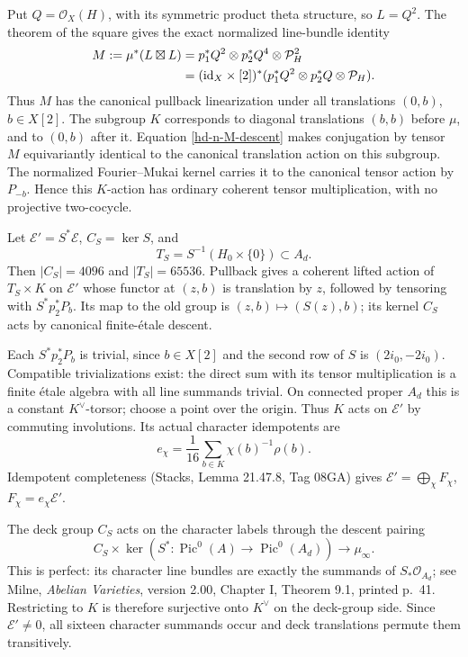 Put $Q=\mathcal O_X(H)$, with its symmetric product theta structure,
so $L=Q^2$. The theorem of the square gives the exact normalized
line-bundle identity
\begin{align}
 M:=\mu^*(L\boxtimes L)
 &=p_1^*Q^2\otimes p_2^*Q^4\otimes\mathcal P_H^2\notag\\
 &=(\mathrm{id}_X\times[2])^*
   (p_1^*Q^2\otimes p_2^*Q\otimes\mathcal P_H).
 \label{hd-n-M-descent}
\end{align}
Thus $M$ has the canonical pullback linearization under all translations
$(0,b)$, $b\in X[2]$. The subgroup $K$ corresponds to diagonal
translations $(b,b)$ before $\mu$, and to $(0,b)$ after it.
Equation \eqref{hd-n-M-descent} makes conjugation by tensor $M$
equivariantly identical to the canonical translation action on this
subgroup. The normalized Fourier--Mukai kernel carries it to the
canonical tensor action by $P_{-b}$. Hence this $K$-action has ordinary
coherent tensor multiplication, with no projective two-cocycle.

Let $\mathcal E'=S^*\mathcal E$, $C_S=\ker S$, and
\[
 T_S=S^{-1}(H_0\times\{0\})\subset A_d.
\]
Then $|C_S|=4096$ and $|T_S|=65536$. Pullback gives a coherent lifted
action of $T_S\times K$ on $\mathcal E'$ whose functor at $(z,b)$ is
translation by $z$, followed by tensoring with $S^*p_2^*P_b$.
Its map to the old group is $(z,b)\mapsto(S(z),b)$; its kernel $C_S$
acts by canonical finite-\'etale descent.

Each $S^*p_2^*P_b$ is trivial, since $b\in X[2]$ and the second row
of $S$ is $(2i_0,-2i_0)$. Compatible trivializations exist: the direct
sum with its tensor multiplication is a finite \'etale algebra with
all line summands trivial. On connected proper $A_d$ this is a constant
$K^\vee$-torsor; choose a point over the origin. Thus $K$ acts on
$\mathcal E'$ by commuting involutions. Its actual character
idempotents are
\[
 e_\chi=\frac1{16}\sum_{b\in K}\chi(b)^{-1}\rho(b).
\]
Idempotent completeness (Stacks, Lemma 21.47.8, Tag 08GA) gives
$\mathcal E'=\bigoplus_\chi F_\chi$, $F_\chi=e_\chi\mathcal E'$.

The deck group $C_S$ acts on the character labels through the descent
pairing
\[
 C_S\times\ker(S^*: \operatorname{Pic}^0(A)\to
 \operatorname{Pic}^0(A_d))\longrightarrow\mu_\infty.
\]
This is perfect: its character line bundles are exactly the summands
of $S_*\mathcal O_{A_d}$; see Milne, \emph{Abelian Varieties},
version 2.00, Chapter I, Theorem 9.1, printed p.~41.
Restricting to $K$ is therefore surjective
onto $K^\vee$ on the deck-group side. Since $\mathcal E'\ne0$, all
sixteen character summands occur and deck translations permute them
transitively.

